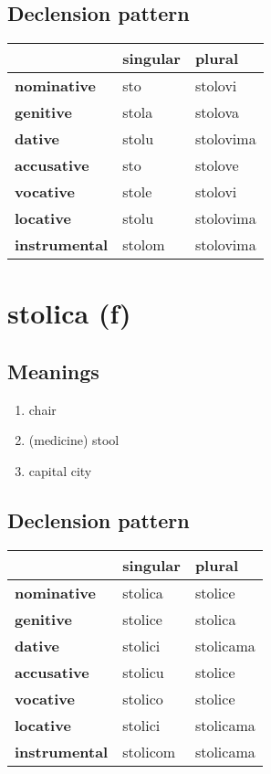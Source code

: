 \subsection*{Declension pattern}
\begin{tabularx}{\linewidth}{Xll}
\toprule
{} & singular &     plural \\
\midrule
\textbf{nominative  } &      sto &    stolovi \\
\textbf{genitive    } &    stola &    stolova \\
\textbf{dative      } &    stolu &  stolovima \\
\textbf{accusative  } &      sto &    stolove \\
\textbf{vocative    } &    stole &    stolovi \\
\textbf{locative    } &    stolu &  stolovima \\
\textbf{instrumental} &   stolom &  stolovima \\
\bottomrule
\end{tabularx}

\filbreak
\section{stolica (f)}
\subsection*{Meanings}
\begin{enumerate}
\item chair
\item (medicine) stool
\item capital city
\end{enumerate}
\subsection*{Declension pattern}
\begin{tabularx}{\linewidth}{Xll}
\toprule
{} &  singular &     plural \\
\midrule
\textbf{nominative  } &   stolica &    stolice \\
\textbf{genitive    } &   stolice &    stolica \\
\textbf{dative      } &   stolici &  stolicama \\
\textbf{accusative  } &   stolicu &    stolice \\
\textbf{vocative    } &   stolico &    stolice \\
\textbf{locative    } &   stolici &  stolicama \\
\textbf{instrumental} &  stolicom &  stolicama \\
\bottomrule
\end{tabularx}


